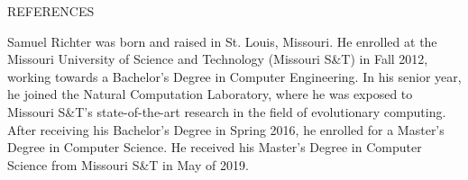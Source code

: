 \documentclass[times,12pt,titlepage]{mstogs}
\begin{document}

\begin{ThesisBibliography}{REFERENCES}

\singlespacing

\end{ThesisBibliography}


\begin{Vita}
Samuel Richter was born and raised in St. Louis, Missouri. He enrolled at the Missouri University of Science and Technology (Missouri S\&T) in Fall 2012, working towards a Bachelor's Degree in Computer Engineering. In his senior year, he joined the Natural Computation Laboratory, where he was exposed to Missouri S\&T's state-of-the-art research in the field of evolutionary computing. After receiving his Bachelor's Degree in Spring 2016, he enrolled for a Master's Degree in Computer Science. He received his Master's Degree in Computer Science from Missouri S\&T in May of 2019.
\end{Vita}
\end{document}
